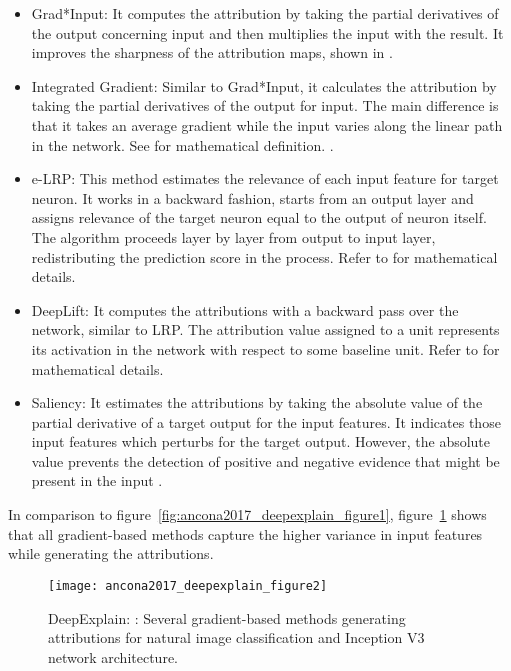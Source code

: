 \documentclass[english]{tktltiki2}
\theoremstyle{definition}
\theoremstyle{remark}
\begin{document}
\begin{itemize}
	\item Grad*Input: It computes the attribution by taking the partial derivatives of the output concerning input and then multiplies the input with the result. It improves the sharpness of the attribution maps, shown in \citep{shrikumar2016not}.
	
	\item Integrated Gradient: Similar to Grad*Input, it calculates the attribution by taking the partial derivatives of the output for input. The main difference is that it takes an average gradient while the input varies along the linear path in the network. See \citep{sundararajan2017axiomatic} for mathematical definition. .
	
	\item e-LRP: This method estimates the relevance of each input feature for target neuron. It works in a backward fashion, starts from an output layer and assigns relevance of the target neuron equal to the output of neuron itself. The algorithm proceeds layer by layer from output to input layer, redistributing the prediction score in the process. Refer to \citep{bach2015pixel} for mathematical details.
	
	\item DeepLift: It computes the attributions with a backward pass over the network, similar to LRP. The attribution value assigned to a unit represents its activation in the network with respect to some baseline unit. Refer to \citep{shrikumar2017learning} for mathematical details.
	
	\item Saliency: It estimates the attributions by taking the absolute value of the partial derivative of a target output for the input features. It indicates those input features which perturbs for the target output. However, the absolute value prevents the detection of positive and negative evidence that might be present in the input \citep{simonyan2013deep}.
\end{itemize}

In comparison to figure~\ref{fig:ancona2017_deepexplain_figure1}, figure~\ref{fig:ancona2017_deepexplain_figure2} shows that all gradient-based methods capture the higher variance in input features while generating the attributions. 

\begin{figure}[H]
	\texttt{[image: ancona2017\_deepexplain\_figure2]}
	\vspace*{-8mm}
	\caption{DeepExplain: \citep{ancona2017towards}: Several gradient-based methods generating attributions for natural image classification and Inception V3 network architecture.}
	\label{fig:ancona2017_deepexplain_figure2}
\end{figure}
\end{document}
